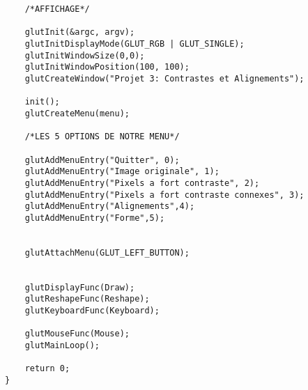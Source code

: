 \documentclass[a4paper , 10pt]{article}
\begin{document}
\begin{verbatim}
    /*AFFICHAGE*/
    
    glutInit(&argc, argv); 
    glutInitDisplayMode(GLUT_RGB | GLUT_SINGLE);
    glutInitWindowSize(0,0);  
    glutInitWindowPosition(100, 100);
    glutCreateWindow("Projet 3: Contrastes et Alignements");  

    init();
    glutCreateMenu(menu);

    /*LES 5 OPTIONS DE NOTRE MENU*/
    
    glutAddMenuEntry("Quitter", 0);
    glutAddMenuEntry("Image originale", 1);
    glutAddMenuEntry("Pixels a fort contraste", 2);
    glutAddMenuEntry("Pixels a fort contraste connexes", 3);
    glutAddMenuEntry("Alignements",4);
    glutAddMenuEntry("Forme",5);


    glutAttachMenu(GLUT_LEFT_BUTTON);


    glutDisplayFunc(Draw);
    glutReshapeFunc(Reshape);
    glutKeyboardFunc(Keyboard);
  
    glutMouseFunc(Mouse);
    glutMainLoop();
    
    return 0;
}

\end{verbatim}
\newpage
\end{document}
